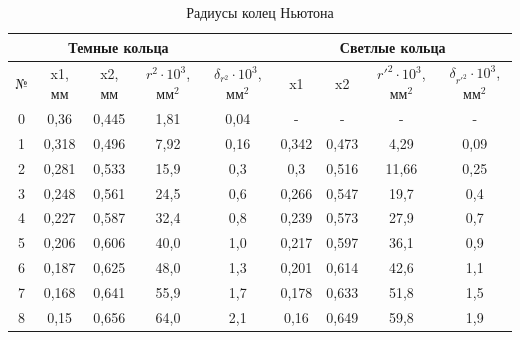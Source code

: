 \documentclass[a4paper, 12pt]{article}
\begin{document}
\begin{table}[h!]
\begin{center}
\caption{Радиусы колец Ньютона}
\begin{tabular}{|c|c|c|c|c|c|c|c|c|}
\hline
\multicolumn{1}{|l|}{} & \multicolumn{3}{c|}{Темные кольца}         &                                   & \multicolumn{4}{c|}{Светлые кольца}                                          \\ \hline
№                      & x1, мм & x2, мм & $r^2 \cdot 10^3$, мм$^2$ & $\delta_{r^2} \cdot 10^3$, мм$^2$ & x1    & x2    & $r'^2 \cdot 10^3$, мм$^2$ & $\delta_{r'^2} \cdot 10^3$, мм$^2$ \\ \hline
0                      & 0,36   & 0,445  & 1,81                     & 0,04                              & -     & -     & -                        & -                                 \\ \hline
1                      & 0,318  & 0,496  & 7,92                     & 0,16                              & 0,342 & 0,473 & 4,29                     & 0,09                              \\ \hline
2                      & 0,281  & 0,533  & 15,9                     & 0,3                               & 0,3   & 0,516 & 11,66                    & 0,25                              \\ \hline
3                      & 0,248  & 0,561  & 24,5                     & 0,6                               & 0,266 & 0,547 & 19,7                     & 0,4                               \\ \hline
4                      & 0,227  & 0,587  & 32,4                     & 0,8                               & 0,239 & 0,573 & 27,9                     & 0,7                               \\ \hline
5                      & 0,206  & 0,606  & 40,0                     & 1,0                               & 0,217 & 0,597 & 36,1                     & 0,9                               \\ \hline
6                      & 0,187  & 0,625  & 48,0                     & 1,3                               & 0,201 & 0,614 & 42,6                     & 1,1                               \\ \hline
7                      & 0,168  & 0,641  & 55,9                     & 1,7                               & 0,178 & 0,633 & 51,8                     & 1,5                               \\ \hline
8                      & 0,15   & 0,656  & 64,0                     & 2,1                               & 0,16  & 0,649 & 59,8                     & 1,9                               \\ \hline

\end{tabular}
\end{center}
\end{table}
\end{document}
